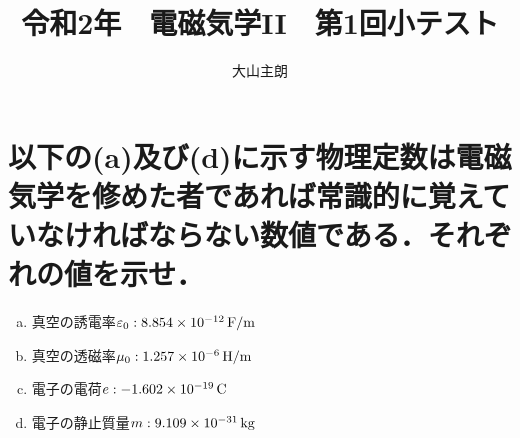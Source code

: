 \documentclass[dvipdfmx]{ujarticle}
\begin{document}
\title{令和2年　電磁気学II　第1回小テスト}
\date{}
\author{大山主朗}

\maketitle

\section{以下の(a)及び(d)に示す物理定数は電磁気学を修めた者であれば常識的に覚えていなければならない数値である．それぞれの値を示せ．}
\begin{enumerate}[(a)]
	\item 真空の誘電率$\varepsilon_{0}:8.854 \times 10^{-12}\,\rm{F/m}$
	\item 真空の透磁率$\mu_{0}:1.257 \times 10^{-6}\,\rm{H/m}$
	\item 電子の電荷$e:-1.602 \times 10^{-19}\,\rm{C}$
	\item 電子の静止質量$m:9.109\times 10^{-31}\,\rm{kg}$
\end{enumerate}
\end{document}
